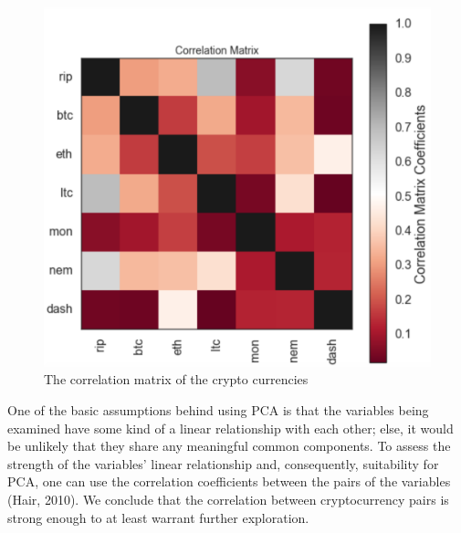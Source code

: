 \documentclass[12pt,twoside]{article}
\begin{document}
\bigbreak
\newpage
\begin{figure}[H]
\begin{center}
\includegraphics[scale=.7]{corr.png}
\caption{The correlation matrix of the crypto currencies}
\end{center}
\end{figure}

\bigbreak

One of the basic assumptions behind using PCA is that the variables being examined have some kind of a linear relationship with each other; else, it would be unlikely that they share any meaningful common components. To assess the strength of the variables’ linear relationship and, consequently, suitability for PCA, one can use the correlation coefficients between the pairs of the variables (Hair, 2010). We conclude that the correlation between cryptocurrency pairs is strong enough to at least warrant further exploration.
\end{document}
